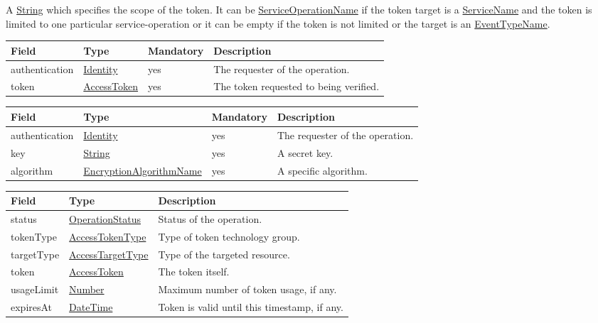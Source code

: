 \documentclass[a4paper]{arrowhead}
\newcommand{\pref}[1]{{\textcolor{ArrowheadGrey}{\hyperref[sec:model:primitives:#1]{#1}}}}
\begin{document}
A \pref{String} which specifies the scope of the token. It can be \pref{ServiceOperationName} if the token target is a \pref{ServiceName} and the token is limited to one particular service-operation or it can be empty if the token is not limited or the target is an \pref{EventTypeName}. 


\begin{table}[ht!]
\begin{tabularx}{\textwidth}{| p{3cm} | p{4.5cm} | p{2cm} | X |} \hline
\rowcolor{gray!33} Field & Type & Mandatory & Description \\ \hline
authentication & \hyperref[sec:model:Identity]{Identity} & yes & The requester of the operation. \\ \hline
token & \pref{AccessToken} & yes & The token requested to being verified. \\ \hline
\end{tabularx}
\end{table}

\clearpage


\begin{table}[ht!]
\begin{tabularx}{\textwidth}{| p{3cm} | p{4.5cm} | p{2cm} | X |} \hline
\rowcolor{gray!33} Field & Type & Mandatory & Description \\ \hline
authentication & \hyperref[sec:model:Identity]{Identity} & yes & The requester of the operation. \\ \hline
key & \pref{String} & yes & A secret key. \\ \hline
algorithm & \pref{EncryptionAlgorithmName} & yes & A specific algorithm. \\ \hline
\end{tabularx}
\end{table}


\begin{table}[ht!]
\begin{tabularx}{\textwidth}{| p{4.25cm} | p{4.5cm} | X |} \hline
\rowcolor{gray!33} Field & Type & Description \\ \hline
status & \pref{OperationStatus} & Status of the operation. \\ \hline
tokenType & \pref{AccessTokenType} & Type of token technology group. \\ \hline
targetType & \pref{AccessTargetType} & Type of the targeted resource. \\ \hline
token & \pref{AccessToken} & The token itself. \\ \hline
usageLimit & \pref{Number} & Maximum number of token usage, if any. \\ \hline
expiresAt & \pref{DateTime} & Token is valid until this timestamp, if any. \\ \hline
\end{tabularx}
\end{table}
\end{document}
